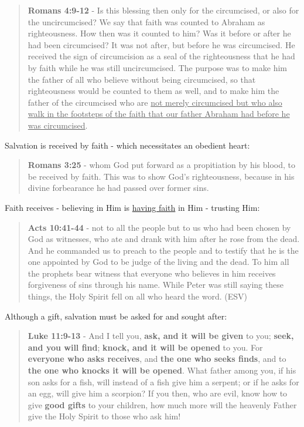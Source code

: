 \documentclass[11pt]{article}
\begin{document}
\begin{quote}
\textbf{Romans 4:9-12} - Is this blessing then only for the circumcised, or also for the uncircumcised? We say that faith was counted to Abraham as righteousness. How then was it counted to him? Was it before or after he had been circumcised? It was not after, but before he was circumcised. He received the sign of circumcision as a seal of the righteousness that he had by faith while he was still uncircumcised. The purpose was to make him the father of all who believe without being circumcised, so that righteousness would be counted to them as well, and to make him the father of the circumcised who are \uline{not merely circumcised but who also walk in the footsteps of the faith that our father Abraham had before he was circumcised}.
\end{quote}

Salvation is received by faith - which necessitates an obedient heart:

\begin{quote}
\textbf{Romans 3:25} - whom God put forward as a propitiation by his blood, to be received by faith. This was to show God's righteousness, because in his divine forbearance he had passed over former sins.
\end{quote}

Faith receives - believing in Him is \uline{having faith} in Him - trusting Him:

\begin{quote}
\textbf{Acts 10:41-44} - not to all the people but to us who had been chosen by God as witnesses, who ate and drank with him after he rose from the dead. And he commanded us to preach to the people and to testify that he is the one appointed by God to be judge of the living and the dead. To him all the prophets bear witness that everyone who believes in him receives forgiveness of sins through his name. While Peter was still saying these things, the Holy Spirit fell on all who heard the word. (ESV)
\end{quote}

Although a gift, salvation must be asked for and sought after:

\begin{quote}
\textbf{Luke 11:9-13} - And I tell you, \textbf{ask, and it will be given} to you; \textbf{seek, and you will find}; \textbf{knock, and it will be opened} to you.  For \textbf{everyone who asks receives}, and \textbf{the one who seeks finds}, and to \textbf{the one who knocks it will be opened}.  What father among you, if his son asks for a fish, will instead of a fish give him a serpent; or if he asks for an egg, will give him a scorpion?  If you then, who are evil, know how to give \textbf{good gifts} to your children, how much more will the heavenly Father give the Holy Spirit to those who ask him!
\end{quote}
\end{document}
